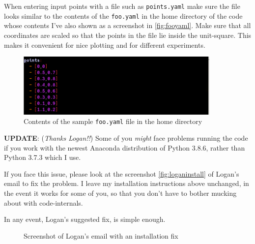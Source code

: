\begin{appendices}
When entering input points with a file such as \verb|points.yaml| make sure the file
looks similar to the contents of the \verb|foo.yaml| in the home directory of the code 
whose contents I've also shown as a screenshot in \autoref{fig:fooyaml}. Make sure that all
coordinates are scaled so that the points in the file lie inside the unit-square. This makes
it convenient for nice plotting and for different experiments. 

\begin{figure}[H]
  \centering
  \includegraphics[width=10cm]{miscimages/fooyaml-screenshot.png}
  \caption{\label{fig:fooyaml} Contents of the sample \texttt{foo.yaml} file in the home directory}
\end{figure}



\newpage

\begin{mdframed}[backgroundcolor=black!10,rightline=false,leftline=false]
\textbf{UPDATE}: (\textit{Thanks Logan!!}) Some of you \textit{might} face problems running the code if you work with the newest Anaconda distribution
of Python 3.8.6, rather than Python 3.7.3 which I use. 

If you face this issue, please look at the screenshot \autoref{fig:loganinstall} of Logan's email to fix the problem. 
I leave my installation instructions above unchanged, in the event it works for some of you, so that you don't have to bother
mucking about with code-internals. 

In any event, Logan's suggested fix, is simple enough. 
   
\begin{figure}[H]
  \centering
  \caption{\label{fig:loganinstall} Screenshot of Logan's email with an installation fix}
\end{figure}
\end{mdframed}




\end{appendices}

